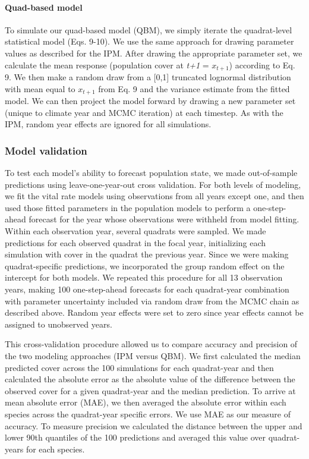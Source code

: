 \documentclass[12pt,]{article}
\begin{document}
\paragraph{Quad-based model}\label{quad-based-model}

To simulate our quad-based model (QBM), we simply iterate the
quadrat-level statistical model (Eqs. 9-10). We use the same approach
for drawing parameter values as described for the IPM. After drawing the
appropriate parameter set, we calculate the mean response (population
cover at \emph{t+1} = \(x_{t+1}\)) according to Eq. 9. We then make a
random draw from a {[}0,1{]} truncated lognormal distribution with mean
equal to \(x_{t+1}\) from Eq. 9 and the variance estimate from the
fitted model. We can then project the model forward by drawing a new
parameter set (unique to climate year and MCMC iteration) at each
timestep. As with the IPM, random year effects are ignored for all
simulations.

\subsubsection{Model validation}\label{model-validation}

To test each model's ability to forecast population state, we made
out-of-sample predictions using leave-one-year-out cross validation. For
both levels of modeling, we fit the vital rate models using observations
from all years except one, and then used those fitted parameters in the
population models to perform a one-step-ahead forecast for the year
whose observations were withheld from model fitting. Within each
observation year, several quadrats were sampled. We made predictions for
each observed quadrat in the focal year, initializing each simulation
with cover in the quadrat the previous year. Since we were making
quadrat-specific predictions, we incorporated the group random effect on
the intercept for both models. We repeated this procedure for all 13
observation years, making 100 one-step-ahead forecasts for each
quadrat-year combination with parameter uncertainty included via random
draw from the MCMC chain as described above. Random year effects were
set to zero since year effects cannot be assigned to unobserved years.

This cross-validation procedure allowed us to compare accuracy and
precision of the two modeling approaches (IPM versus QBM). We first
calculated the median predicted cover across the 100 simulations for
each quadrat-year and then calculated the absolute error as the absolute
value of the difference between the observed cover for a given
quadrat-year and the median prediction. To arrive at mean absolute error
(MAE), we then averaged the absolute error within each species across
the quadrat-year specific errors. We use MAE as our measure of accuracy.
To measure precision we calculated the distance between the upper and
lower 90th quantiles of the 100 predictions and averaged this value over
quadrat-years for each species.
\end{document}
